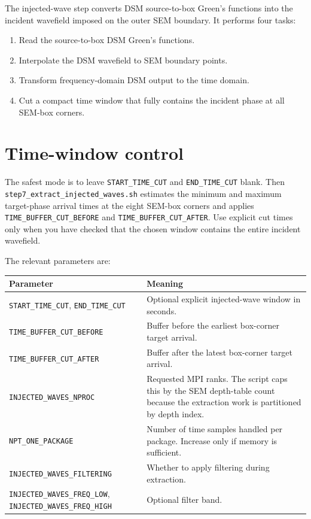 \documentclass[11pt,oneside]{book}
\DeclareRobustCommand{\code}[1]{\nolinkurl{#1}}
\begin{document}
The injected-wave step converts DSM source-to-box Green's functions into the
incident wavefield imposed on the outer SEM boundary. It performs four tasks:
\begin{enumerate}[label=\arabic*.]
  \item Read the source-to-box DSM Green's functions.
  \item Interpolate the DSM wavefield to SEM boundary points.
  \item Transform frequency-domain DSM output to the time domain.
  \item Cut a compact time window that fully contains the incident phase at
  all SEM-box corners.
\end{enumerate}

\section{Time-window control}

The safest mode is to leave \code{START_TIME_CUT} and \code{END_TIME_CUT}
blank. Then \code{step7_extract_injected_waves.sh} estimates the minimum and
maximum target-phase arrival times at the eight SEM-box corners and applies
\code{TIME_BUFFER_CUT_BEFORE} and \code{TIME_BUFFER_CUT_AFTER}. Use explicit
cut times only when you have checked that the chosen window contains the
entire incident wavefield.

The relevant parameters are:
\begin{longtable}{L{0.35\textwidth}L{0.56\textwidth}}
\toprule
Parameter & Meaning \\
\midrule
\code{START_TIME_CUT}, \code{END_TIME_CUT} & Optional explicit injected-wave
window in seconds. \\
\code{TIME_BUFFER_CUT_BEFORE} & Buffer before the earliest box-corner target
arrival. \\
\code{TIME_BUFFER_CUT_AFTER} & Buffer after the latest box-corner target
arrival. \\
\code{INJECTED_WAVES_NPROC} & Requested MPI ranks. The script caps this by
the SEM depth-table count because the extraction work is partitioned by depth
index. \\
\code{NPT_ONE_PACKAGE} & Number of time samples handled per package. Increase
only if memory is sufficient. \\
\code{INJECTED_WAVES_FILTERING} & Whether to apply filtering during extraction. \\
\code{INJECTED_WAVES_FREQ_LOW}, \code{INJECTED_WAVES_FREQ_HIGH} & Optional
filter band. \\
\bottomrule
\end{longtable}
\end{document}
